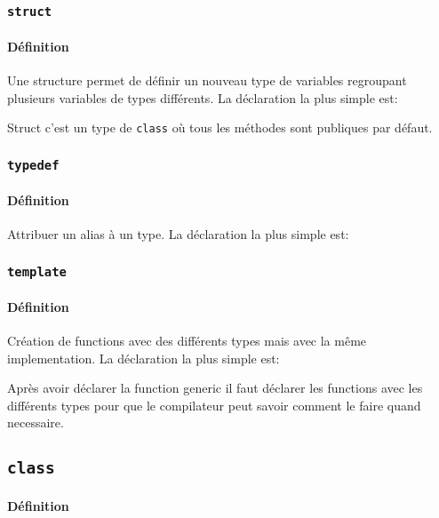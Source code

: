 \documentclass{article}
\begin{document}
\subsubsection{\texttt{struct}}
\paragraph{Définition}Une structure permet de définir un nouveau type de variables regroupant plusieurs variables de types différents. La déclaration la plus simple est:
\begin{scriptsize}
    \mycode
\end{scriptsize}
Struct c'est un type de \texttt{class} où tous les méthodes sont publiques par défaut.

\subsubsection{\texttt{typedef}}
\paragraph{Définition}Attribuer un alias à un type. La déclaration la plus simple est:
\begin{scriptsize}
    \mycode
\end{scriptsize}

\subsubsection{\texttt{template}}
\paragraph{Définition}Création de functions avec des différents types mais avec la même implementation. La déclaration la plus simple est:
\begin{scriptsize}
    \mycode
\end{scriptsize}
Après avoir déclarer la function generic il faut déclarer les functions avec les différents types pour que le compilateur peut savoir comment le faire quand necessaire.

\subsection{\texttt{class}}
\paragraph{Définition}
\end{document}
